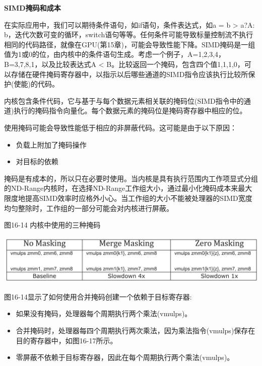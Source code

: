 \hspace*{\fill} \par %
\textbf{SIMD掩码和成本}

在实际应用中，我们可以期待条件语句，如if语句，条件表达式，如a = b > a?A: b，迭代次数可变的循环，switch语句等等。任何条件可能导致标量控制流不执行相同的代码路径，就像在GPU(第15章)，可能会导致性能下降。SIMD掩码是一组值为1或0的位，由内核中的条件语句生成。考虑一个例子，A={1,2,3,4}， B={3,7,8,1}，以及比较表达式A < B。比较返回一个掩码，包含四个值{1,1,1,0}，可以存储在硬件掩码寄存器中，以指示以后哪些通道的SIMD指令应该执行比较所保护(使能)的代码。\par

内核包含条件代码，它与基于与每个数据元素相关联的掩码位(SIMD指令中的通道)执行的掩码指令向量化。每个数据元素的掩码位是掩码寄存器中相应的位。\par

使用掩码可能会导致性能低于相应的非屏蔽代码。这可能是由于以下原因：\par

\begin{itemize}
	\item 负载上附加了掩码操作
	\item 对目标的依赖
\end{itemize}

掩码是有成本的，所以只在必要时使用。当内核是具有执行范围内工作项显式分组的ND-Range内核时，在选择ND-Range工作组大小，通过最小化掩码成本来最大限度地提高SIMD效率时应格外小心。当工作组的大小不能被处理器的SIMD宽度均匀整除时，工作组的一部分可能会对内核进行屏蔽。\par

\hspace*{\fill} \par %
图16-14 内核中使用的三种掩码
\begin{center}
	\includegraphics[width=1.0\textwidth]{content/chapter-16/images/11}
\end{center}

图16-14显示了如何使用合并掩码创建一个依赖于目标寄存器:\par

\begin{itemize}
	\item 如果没有掩码，处理器每个周期执行两个乘法(vmulps)。
	\item 合并掩码时，处理器每四个周期执行两次乘法，因为乘法指令(vmulps)保存在目的寄存器中，如图16-17所示。
	\item 零屏蔽不依赖于目标寄存器，因此在每个周期执行两个乘法(vmulps)。
\end{itemize}

